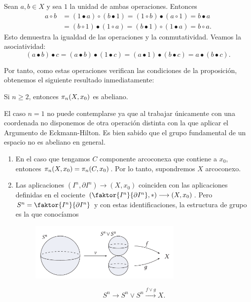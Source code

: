 \begin{demo}
Sean $a,b \in X$ y sea $1$ la unidad de ambas operaciones. Entonces
\begin{align*}
a \circ b &= (1 \bullet a) \circ (b \bullet 1) = (1 \circ b) \bullet (a \circ 1) = b \bullet a  \\
&= (b \circ 1) \bullet (1 \circ a) = (b \bullet 1) \circ (1 \bullet a) = b \circ a.
\end{align*}
Esto demuestra la igualdad de las operaciones y la conmutatividad. Veamos la asociatividad:
\[
(a \bullet b) \bullet c = (a \bullet b) \bullet (1 \bullet c) = (a \bullet 1) \bullet (b \bullet c) = a \bullet (b \bullet c).
\]
\end{demo}
Por tanto, como estas operaciones verifican las condiciones de la proposición, obtenemos el siguiente resultado inmediatamente:
\begin{teor}
Si $n \geq 2$, entonces $\pi_{n}(X, x_0)$ es abeliano.
\end{teor}
El caso $n=1$ no puede contemplarse ya que al trabajar únicamente con una coordenada no disponemos de otra operación distinta con la que aplicar el Argumento de Eckmann-Hilton. Es bien sabido que el grupo fundamental de un espacio no es abeliano en general.
\begin{custom}[Observaciones]
\begin{enumerate}
\item En el caso que tengamos $C$ componente arcoconexa que contiene a $x_0$, entonces $\pi_{n}(X, x_0) = \pi_{n}(C, x_0)$. Por lo tanto, supondremos $X$ arcoconexo.

\item Las aplicaciones $ (I^n, \partial I^n) \longrightarrow (X, x_0)$ coinciden con las aplicaciones definidas en el cociente $(\faktor{I^n}{\partial I^n}, \ast) \longrightarrow (X, x_0)$. Pero $S^n = \faktor{I^n}{\partial I^n}$ y con estas identificaciones, la estructura de grupo es la que conocíamos \par
\begin{figure}[h]
\centering
\includegraphics[width = 0.7\textwidth]{images/ejgruphomot}
\end{figure}
\[S^n \longrightarrow S^n \vee S^n \stackrel{f \vee g}{\longrightarrow} X. \]
\end{enumerate}
\end{custom}
